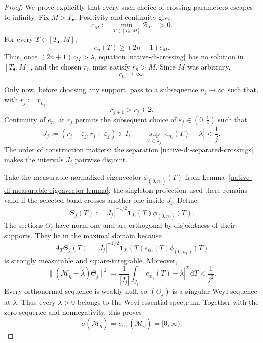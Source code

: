 \begin{proof}
We prove explicitly that every such choice of crossing parameters escapes
to infinity.  Fix \(M>T_\bullet\).  Positivity and continuity give
\[
 c_M:=\min_{T\in[T_\bullet,M]}\mathcal B_{T,-}>0.
\]
For every \(T\in[T_\bullet,M]\),
\[
 e_n(T)\ge(2n+1)c_M.
\]
Thus, once \((2n+1)c_M>\lambda\), equation
\eqref{native-di-crossing} has no solution in
\([T_\bullet,M]\), and the chosen \(r_n\) must satisfy \(r_n>M\).
Since \(M\) was arbitrary,
\begin{equation}
 r_n\longrightarrow\infty.
\label{native-di-crossings-escape}
\end{equation}

Only now, before choosing any support, pass to a subsequence
\(n_j\to\infty\) such that, with \(r_j:=r_{n_j}\),
\begin{equation}
 r_{j+1}>r_j+2.
\label{native-di-separated-crossings}
\end{equation}
Continuity of \(e_{n_j}\) at \(r_j\) permits the subsequent choice of
\(\varepsilon_j\in(0,\tfrac14)\) such that
\[
 J_j:=(r_j-\varepsilon_j,r_j+\varepsilon_j)\Subset I,
 \qquad
 \sup_{T\in J_j}|e_{n_j}(T)-\lambda|<\frac1j.
\]
The order of construction matters: the separation
\eqref{native-di-separated-crossings} makes the intervals \(J_j\)
pairwise disjoint.

Take the measurable normalized eigenvector
\(\phi_{(0,n_j)}(T)\) from
Lemma~\ref{native-di-measurable-eigenvector-lemma}; the singleton
projection used there remains valid if the selected band crosses another
one inside \(J_j\).  Define
\begin{equation}
 \Theta_j(T)
 :=|J_j|^{-1/2}\mathbf 1_{J_j}(T)\phi_{(0,n_j)}(T).
\label{native-di-positive-Weyl-sequence}
\end{equation}
The sections \(\Theta_j\) have norm one and are orthogonal by disjointness
of their supports.  They lie in the maximal domain because
\[
 A_T\Theta_j(T)
 =|J_j|^{-1/2}\mathbf 1_{J_j}(T)
   e_{n_j}(T)\phi_{(0,n_j)}(T)
\]
is strongly measurable and square-integrable.  Moreover,
\[
 \|(\widetilde{\mathscr M}_\eta-\lambda)\Theta_j\|^2
 =\frac1{|J_j|}\int_{J_j}
   |e_{n_j}(T)-\lambda|^2\,\mathrm d T
 <\frac1{j^2}.
\]
Every orthonormal sequence is weakly null, so
\((\Theta_j)\) is a singular Weyl sequence at \(\lambda\).
Thus every \(\lambda>0\) belongs to the Weyl essential spectrum.  Together
with the zero sequence and nonnegativity, this proves
\begin{equation}
 \sigma(\widetilde{\mathscr M}_\eta)
 =\sigma_{\mathrm{ess}}(\widetilde{\mathscr M}_\eta)
 =[0,\infty).
\label{native-di-spectrum-essential}
\end{equation}


\end{proof}
